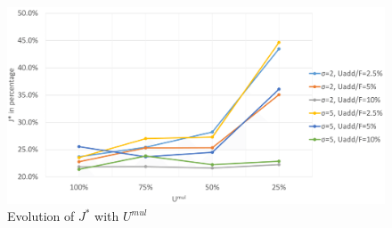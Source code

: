 \begin{figure}
	\label{fig:umul}
	\caption{Evolution of $J^{*}$ with $U^{mul}$}
	\includegraphics[width=7in]{figures/umul.png}
\end{figure}